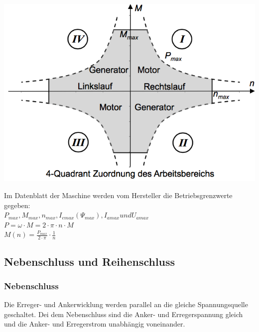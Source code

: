 \begin{minipage}{0.4 \linewidth}
\includegraphics[width = \linewidth]{./Pics/VL45/Arbeitsbereich}
\end{minipage}
\begin{minipage}{0.6 \linewidth}
Im Datenblatt der Maschine werden vom Hersteller die Betriebsgrenzwerte gegeben: \\

$P_{max},M_{max},n_{max},I_{emax}(\Psi_{max}),I_{amax} und U_{amax}$\\

$P = \omega \cdot M = 2 \cdot \pi \cdot n \cdot M$ \\

$M(n) = \frac{P_{max}}{2 \cdot \pi} \cdot \frac{1}{n}$\\
\end{minipage}

\subsection{Nebenschluss und Reihenschluss}
\subsubsection{Nebenschluss}

Die Erreger- und Ankerwicklung werden parallel an die gleiche Spannungsquelle geschaltet. Dei dem Nebenschluss sind die Anker- und Erregerspannung gleich und die Anker- und Erregerstrom unabhängig voneinander.

